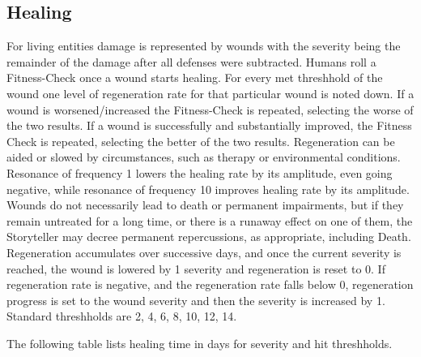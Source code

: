 \subsection{Healing}\label{subsec:healing}
For living entities damage is represented by wounds with the severity being the remainder of the damage after all
defenses were subtracted.
Humans roll a Fitness-Check once a wound starts healing.
For every met threshhold of the wound one level of regeneration rate for that particular wound is noted down.
If a wound is worsened/increased the Fitness-Check is repeated, selecting the worse of the two results.
If a wound is successfully and substantially improved, the Fitness Check is repeated, selecting the better of the two
results.
Regeneration can be aided or slowed by circumstances, such as therapy or environmental conditions.
Resonance of frequency 1 lowers the healing rate by its amplitude, even going negative, while resonance of frequency 10
improves healing rate by its amplitude.
Wounds do not necessarily lead to death or permanent impairments, but if they remain untreated for a long time, or there
is a runaway effect on one of them, the Storyteller may decree permanent repercussions, as appropriate, including Death.
Regeneration accumulates over successive days, and once the current severity is reached, the wound is lowered by 1
severity and regeneration is reset to 0.
If regeneration rate is negative, and the regeneration rate falls below 0, regeneration progress is set to the wound
severity and then the severity is increased by 1.
Standard threshholds are 2, 4, 6, 8, 10, 12, 14. \par
The following table lists healing time in days for severity and hit threshholds.\par
